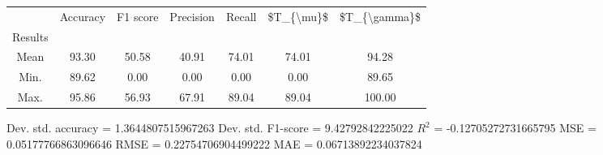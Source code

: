 \begin{tabular}{|c|c|c|c|c|c|c|}
\toprule
{} &  Accuracy &  F1 score &  Precision &  Recall &  \$T\_\{\textbackslash mu\}\$ &  \$T\_\{\textbackslash gamma\}\$ \\
Results &           &           &            &         &            &               \\
\hline
Mean    &     93.30 &     50.58 &      40.91 &   74.01 &      74.01 &         94.28 \\
Min.    &     89.62 &      0.00 &       0.00 &    0.00 &       0.00 &         89.65 \\
Max.    &     95.86 &     56.93 &      67.91 &   89.04 &      89.04 &        100.00 \\
\bottomrule
\end{tabular}

 Dev. std. accuracy = 1.3644807515967263
 Dev. std. F1-score = 9.42792842225022
 $R^2$ = -0.12705272731665795
 MSE = 0.05177766863096646
 RMSE = 0.22754706904499222
 MAE = 0.06713892234037824